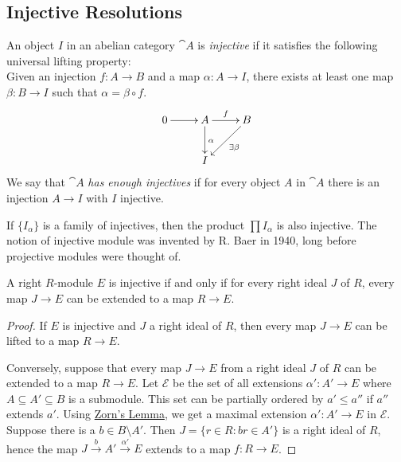 \subsection{Injective Resolutions}

\begin{definition}
	An object $I$ in an abelian category $\cat{A}$ is \textit{injective} if it satisfies the following universal lifting property: \\
	Given an injection $f: A \rightarrow B$ and a map $\alpha:A\rightarrow I$, there exists at least one map $\beta:B\rightarrow I$ such that $\alpha=\beta\circ f$.
	\begin{align*}
		\xymatrix{
			0 \ar[r] &A \ar[r]^f \ar[d]^\alpha & B \ar[ld]^{\exists\beta} \\
			&I
		}
	\end{align*}
	We say that $\cat{A}$ \textit{has enough injectives} if for every object $A$ in $\cat{A}$ there is an injection $A\rightarrow I$ with $I$ injective. 
\end{definition}

\begin{note}
	If $\{I_\alpha\}$ is a family of injectives, then the product $\prod I_\alpha$ is also injective.
	The notion of injective module was invented by R. Baer in 1940, long before projective modules were thought of.
\end{note}

\begin{criterion}[Baer]
	A right $R$-module $E$ is injective if and only if for every right ideal $J$ of $R$, every map $J\rightarrow E$ can be extended to a map $R\rightarrow E$.
\end{criterion}

\begin{proof}
	If $E$ is injective and $J$ a right ideal of $R$, then every map $J \rightarrow E$ can be lifted to a map $R \rightarrow E$.
	
	Conversely, suppose that every map $J \rightarrow E$ from a right ideal $J$ of $R$ can be extended to a map $R \rightarrow E$.
	Let $\mathcal{E}$ be the set of all extensions $\alpha': A' \rightarrow E$ where $A \subseteq A' \subseteq B$ is a submodule.
	This set can be partially ordered by $a' \leq a''$ if $a''$ extends $a'$.
	Using \hyperref[zorn]{Zorn's Lemma}, we get a maximal extension $\alpha': A' \rightarrow E$ in $\mathcal{E}$.
	Suppose there is a $b \in B\setminus A'$.
	Then $J = \{r \in R : br \in A'\}$ is a right ideal of $R$, hence the map $J \overset{b}{\longrightarrow} A' \overset{\alpha'}{\longrightarrow} E$ extends to a map $f: R \rightarrow E$.
\end{proof}

